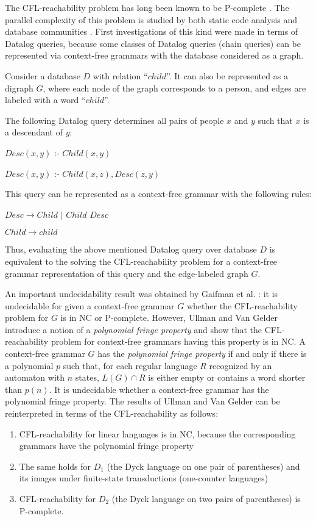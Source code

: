 \documentclass{ws-ijfcs}
\begin{document}
The CFL-reachability problem has long been known to be P-complete \cite{PCompl}. The parallel complexity of this problem is studied by both static code analysis \cite{RepSeq, RepsBasic} and database communities \cite{ChainQ, Ullman, Yannakakis}. First investigations of this kind were made in terms of Datalog queries, because some classes of Datalog queries (chain queries) can be represented via context-free grammars with the database considered as a graph. 
\begin{example}
Consider a database  $D$ with relation ``$child$''. It can also be represented as a digraph $G$, where each node of the graph corresponds to a person, and edges are labeled with a word ``$child$''.


The following Datalog query determines all pairs of people $x$ and $y$ such that $x$ is a descendant of $y$: 


$Desc(x, y)$ :- $Child(x, y)$

$Desc(x, y)$ :- $Child(x, z), Desc(z, y)$


This query can be represented as a context-free grammar with the following rules: 


$Desc \rightarrow Child$ $\vert$ $Child$ $Desc$


$Child  \rightarrow child$


Thus, evaluating the above mentioned Datalog query over database $D$ is equivalent to the solving the CFL-reachability problem for a context-free grammar representation of this query and the edge-labeled graph $G$.
\end{example}
An important undecidability result was obtained by Gaifman et al. \cite{Vardi}:  it is undecidable for given a context-free grammar $G$ whether the CFL-reachability problem for $G$ is in NC or P-complete. However, Ullman and Van Gelder \cite{Ullman} introduce a notion of a  \textit{polynomial fringe property} and show that the CFL-reachability problem for context-free grammars having this property is in NC. A context-free grammar $G$ has the \textit{polynomial fringe property} if and only if there is a polynomial $p$ such that, for each regular language $R$ recognized by an automaton with $n$ states, $L(G) \cap R$ is either empty or contains a word shorter than $p(n)$. It is undecidable whether a context-free grammar has the polynomial fringe property. The results of Ullman and Van Gelder \cite{Ullman} can be reinterpreted in terms of the CFL-reachability as follows: 
\begin{enumerate}
\item CFL-reachability for linear languages is in NC, because the corresponding grammars have the polynomial fringe property
\item The same holds for $D_1$ (the Dyck language on one pair of parentheses) and its images under finite-state transductions (one-counter languages)
\item CFL-reachability for $D_2$ (the Dyck language on two pairs of parentheses) is P-complete.
\end{enumerate}
\end{document}
